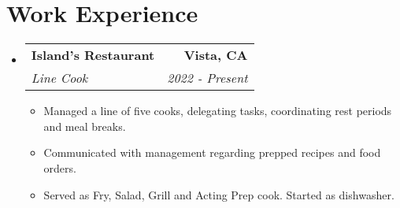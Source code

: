 \documentclass[letterpaper,11pt]{article}
\makeatletter
\newcommand{\resumeItem}[1]{
  \item\small{
    {#1 \vspace{-3pt}}
  }
}
\newcommand{\resumeSubheading}[4]{
  \vspace{-3pt}\item
    \begin{tabular*}{1.0\textwidth}[t]{l@{\extracolsep{\fill}}r}
      \textbf{#1} & \textbf{\small #2} \\
      \textit{\small#3} & \textit{\small #4} \\
    \end{tabular*}\vspace{-7pt}
}
\newcommand{\resumeSubHeadingListStart}{\begin{itemize}[leftmargin=0.0in, label={}]}
\newcommand{\resumeSubHeadingListEnd}{\end{itemize}}
\newcommand{\resumeItemListStart}{\begin{itemize}}
\newcommand{\resumeItemListEnd}{\end{itemize}\vspace{0pt}}
\makeatother
\begin{document}
\section{Work Experience}
    \resumeSubHeadingListStart
    
        \resumeSubheading
        {Island's Restaurant}{Vista, CA}
            {Line Cook}{2022 - Present}
            \resumeItemListStart
                \resumeItem{Managed a line of five cooks, delegating tasks, coordinating rest periods and meal breaks.}
                \resumeItem{Communicated with management regarding prepped recipes and food orders.}
                \resumeItem{Served as Fry, Salad, Grill and Acting Prep cook. Started as dishwasher.}
            \resumeItemListEnd
    \resumeSubHeadingListEnd
 
\end{document}
